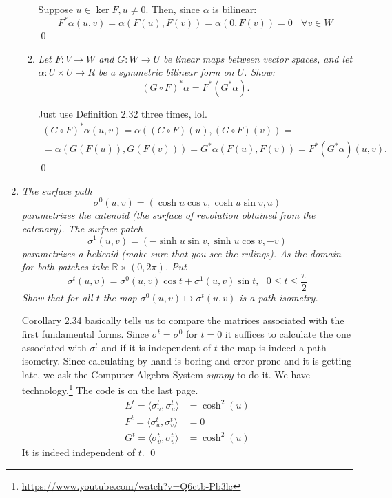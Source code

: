 \documentclass[a4paper,11pt,notitlepage,fullpage]{article}
\begin{document}
\begin{enumerate}
\begin{enumerate}
Suppose $u \in \ker F, u \neq 0$. Then, since $\alpha$ is bilinear:
\begin{equation*}
F^*\alpha(u,v) = \alpha(F(u), F(v)) = \alpha(0, F(v)) = 0 ~~~~ \forall v\in W
\end{equation*}
\qed

\item \emph{Let $F : V \to W$ and $G: W \to U$ be linear maps between vector spaces,
and let $\alpha: U \times U \to R$ be a symmetric bilinear form on $U$. Show:}
\begin{equation*}
(G \circ F)^* \alpha = F^*(G^*\alpha).
\end{equation*}

Just use Definition 2.32 three times, lol.
\begin{multline*}
(G \circ F)^*\alpha(u,v) = \alpha((G \circ F)(u), (G \circ F)(v)) =\\= \alpha(G(F(u)), G(F(v))) = G^*\alpha(F(u), F(v)) = F^*(G^*\alpha)(u,v).
\end{multline*}
\qed
\end{enumerate}

\item \emph{The surface path}
\begin{equation*}
\sigma^0(u,v) = (\cosh u \cos v, \cosh u \sin v, u)
\end{equation*}
\emph{parametrizes the catenoid (the surface of revolution obtained from the catenary). The surface patch}
\begin{equation*}
\sigma^1(u,v) = (-\sinh u \sin v, \sinh u \cos v, -v)
\end{equation*}
\emph{parametrizes a helicoid (make sure that you see the rulings). As the domain for both patches take $\mathbb R \times (0,2\pi)$. Put}
\begin{equation*}
\sigma^t(u,v) = \sigma^0(u,v) \cos t + \sigma^1(u,v) \sin t, ~~~ 0 \leq t \leq \frac{\pi}{2}
\end{equation*}
\emph{Show that for all $t$ the map $\sigma^0(u,v) \mapsto \sigma^t(u,v)$ is a path isometry.}

Corollary 2.34 basically tells us to compare the matrices associated with the first fundamental forms. Since $\sigma^t = \sigma^0$ for $t = 0$ it suffices to calculate the one associated with $\sigma^t$ and if it is independent of $t$ the map is indeed a path isometry. Since calculating by hand is boring and error-prone and it is getting late, we ask the Computer Algebra System $sympy$ to do it. We have technology.\footnote{\url{https://www.youtube.com/watch?v=Q6ctb-Pb3lc}} The code is on the last page.
\begin{align*}
E^t = \langle\sigma^t_u, \sigma^t_u\rangle &= \cosh^{2}{\left (u \right )} \\
F^t = \langle\sigma^t_u, \sigma^t_v\rangle &= 0 \\
G^t = \langle\sigma^t_v, \sigma^t_v\rangle &= \cosh^{2}{\left (u \right )}
\end{align*}
It is indeed independent of $t$. \qed


\end{enumerate}
\end{document}
